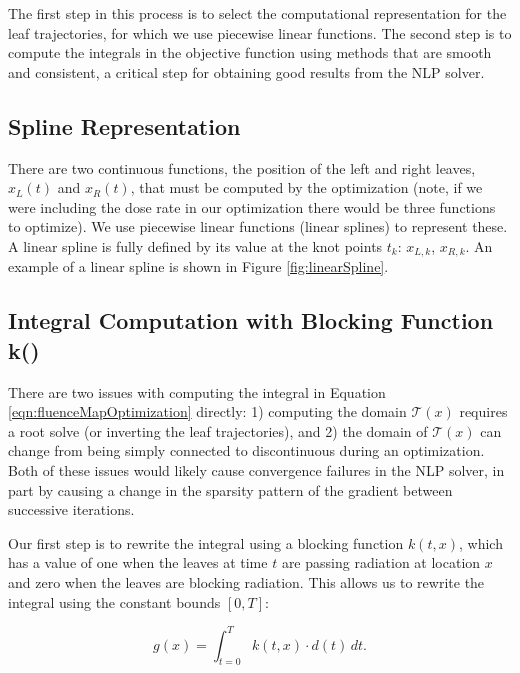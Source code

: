 \documentclass{iopart}
\begin{document}
The first step in this process is to select the computational representation for the leaf trajectories, for which we use piecewise linear functions. The second step is to compute the integrals in the objective function using methods that are smooth and consistent, a critical step for obtaining good results from the NLP solver\cite{Betts2010}.

\subsection{Spline Representation}

There are two continuous functions, the position of the left and right leaves, $x_L(t)$ and $x_R(t)$, that must be computed by the optimization (note, if we were including the dose rate in our optimization there would be three functions to optimize). We use piecewise linear functions (linear splines) to represent these. A linear spline is fully defined by its value at the knot points $t_k$: $x_{L,k}$, $x_{R,k}$. An example of a linear spline is shown in Figure \ref{fig:linearSpline}.



\subsection{Integral Computation with Blocking Function k()}
\label{sec:IntegralComputationWithBlockingFunction}

There are two issues with computing the integral in Equation \ref{eqn:fluenceMapOptimization} directly: 1) computing the domain $\mathcal{T}(x)$ requires a root solve (or inverting the leaf trajectories), and 2) the domain of $\mathcal{T}(x)$ can change from being simply connected to discontinuous during an optimization. Both of these issues would likely cause convergence failures in the NLP solver, in part by causing a change in the sparsity pattern of the gradient
between successive iterations.

Our first step is to rewrite the integral using a blocking function $k(t,x)$, which has a value of one when the leaves at time $t$ are passing radiation at location $x$ and zero when the leaves are blocking radiation. This allows us to rewrite the integral using the constant bounds $[0, T]$:

\begin{equation}
  g(x) = \int_{t=0}^T \! k(t, x) \cdot d(t) \, dt .
  \label{eqn:fluenceDoseSimpleBounds}
\end{equation}
\end{document}
